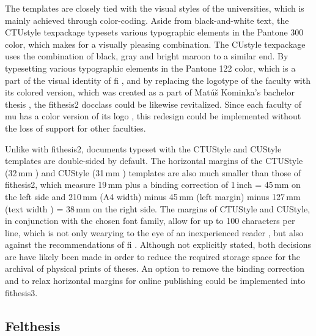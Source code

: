       The templates are closely tied with the visual styles of the universities, which is mainly achieved through color-coding. Aside from black-and-white text, the CTUstyle \gls{texpackage} typesets various typographic elements in the  Pantone 300 color, which makes for a visually pleasing combination. The CUstyle \gls{texpackage} uses the combination of black, gray and  bright maroon to a similar end. By typesetting various typographic elements in the  Pantone 122 color, which is a part of the visual identity of \gls{fi} \cite{filogo}, and by replacing the logotype of the faculty with its colored version, which was created as a part of Matúš Kominka's bachelor thesis \cite{Kominka08}, the fithesis2 \gls{docclass} could be likewise revitalized.  Since each faculty of \gls{mu} has a color version of its logo \cite{muvis}, this redesign could be implemented without the loss of support for other faculties. 

      Unlike with fithesis2, documents typeset with the CTUStyle and CUStyle templates are double-sided by default. The horizontal margins of the CTUStyle (32\,mm \cite[line 249]{ctustyleCode}) and CUStyle (31\,mm \cite[line 229]{custyleCode}) templates are also much smaller than those of fithesis2, which measure 19\,mm \cite[lines 968\nobreakdash--976]{fithesis2Code} plus a binding correction of 1\,inch \cite{latexlayout} = 45\,mm on the left side and 210\,mm (A4 width) minus 45\,mm (left margin) minus 127\,mm (text width \cite[lines~989, 1017, 1045]{fithesis2Code}) = 38\,mm on the right side. The margins of CTUStyle and CUStyle, in conjunction with the chosen font family, allow for up to 100 characters per line, which is not only wearying to the eye of an inexperienced reader , but also against the recommendations of \gls{fi} \cite[section 3.2.3]{bpdpfi}. Although not explicitly stated, both decisions are have likely been made in order to reduce the required storage space for the archival of physical prints of theses. An option to remove the binding correction and to relax horizontal margins for online publishing could be implemented into fithesis3. 

      \subsection{Felthesis}


